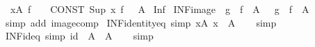 \begin{isabellebody}
\ \ {\isachardoublequoteopen}{\isasymSqunion}x{\isasymin}A{\isachardot}{\kern0pt}\ f{\isachardoublequoteclose}\ \ \ {\isasymrightleftharpoons}\ {\isachardoublequoteopen}CONST\ Sup\ {\isacharparenleft}{\kern0pt}{\isacharparenleft}{\kern0pt}{\isasymlambda}x{\isachardot}{\kern0pt}\ f{\isacharparenright}{\kern0pt}\ {\isacharbackquote}{\kern0pt}\ \ A{\isacharparenright}{\kern0pt}{\isachardoublequoteclose}\isanewline
\isanewline
{}\isamarkupfalse%
\ Inf\isanewline
{}\isanewline
\isanewline
{}\isamarkupfalse%
\ INF{\isacharunderscore}{\kern0pt}image{\isacharcolon}{\kern0pt}\ {\isachardoublequoteopen}{\isasymSqinter}\ {\isacharparenleft}{\kern0pt}g\ {\isacharbackquote}{\kern0pt}\ f\ {\isacharbackquote}{\kern0pt}\ A{\isacharparenright}{\kern0pt}\ {\isacharequal}{\kern0pt}\ {\isasymSqinter}\ {\isacharparenleft}{\kern0pt}{\isacharparenleft}{\kern0pt}g\ {\isasymcirc}\ f{\isacharparenright}{\kern0pt}\ {\isacharbackquote}{\kern0pt}\ A{\isacharparenright}{\kern0pt}{\isachardoublequoteclose}\isanewline
%
\isadelimproof
\ \ %
\endisadelimproof
%
\isatagproof
{}\isamarkupfalse%
\ {\isacharparenleft}{\kern0pt}simp\ add{\isacharcolon}{\kern0pt}\ image{\isacharunderscore}{\kern0pt}comp{\isacharparenright}{\kern0pt}%
\endisatagproof
{\isafoldproof}%
%
\isadelimproof
\isanewline
%
\endisadelimproof
\isanewline
{}\isamarkupfalse%
\ INF{\isacharunderscore}{\kern0pt}identity{\isacharunderscore}{\kern0pt}eq\ {\isacharbrackleft}{\kern0pt}simp{\isacharbrackright}{\kern0pt}{\isacharcolon}{\kern0pt}\ {\isachardoublequoteopen}{\isacharparenleft}{\kern0pt}{\isasymSqinter}x{\isasymin}A{\isachardot}{\kern0pt}\ x{\isacharparenright}{\kern0pt}\ {\isacharequal}{\kern0pt}\ {\isasymSqinter}A{\isachardoublequoteclose}\isanewline
%
\isadelimproof
\ \ %
\endisadelimproof
%
\isatagproof
{}\isamarkupfalse%
\ simp%
\endisatagproof
{\isafoldproof}%
%
\isadelimproof
\isanewline
%
\endisadelimproof
\isanewline
{}\isamarkupfalse%
\ INF{\isacharunderscore}{\kern0pt}id{\isacharunderscore}{\kern0pt}eq\ {\isacharbrackleft}{\kern0pt}simp{\isacharbrackright}{\kern0pt}{\isacharcolon}{\kern0pt}\ {\isachardoublequoteopen}{\isasymSqinter}{\isacharparenleft}{\kern0pt}id\ {\isacharbackquote}{\kern0pt}\ A{\isacharparenright}{\kern0pt}\ {\isacharequal}{\kern0pt}\ {\isasymSqinter}A{\isachardoublequoteclose}\isanewline
%
\isadelimproof
\ \ %
\endisadelimproof
%
\isatagproof
{}\isamarkupfalse%
\ simp%
\endisatagproof
{\isafoldproof}%
%
\isadelimproof
\isanewline
%
\endisadelimproof
\isanewline
{}\isamarkupfalse%

\end{isabellebody}

